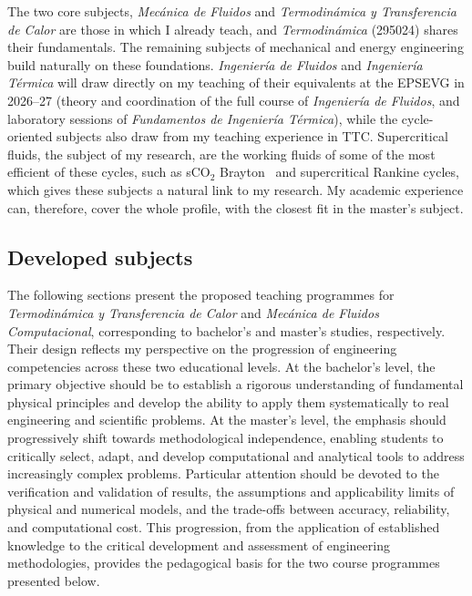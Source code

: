 \documentclass[11pt]{article}
\begin{document}
The two core subjects, \textit{Mecánica de Fluidos} and \textit{Termodinámica y Transferencia de Calor} are those in which I already teach, and \textit{Termodin\'amica} (295024) shares their fundamentals. 
The remaining subjects of mechanical and energy engineering build naturally on these foundations. \textit{Ingeniería de Fluidos} and \textit{Ingeniería
Térmica} will draw directly on my teaching of their equivalents at the EPSEVG in 2026--27 (theory and coordination of the full course of \textit{Ingeniería de Fluidos}, and laboratory sessions of \textit{Fundamentos de Ingenier\'ia T\'ermica}), while the cycle-oriented subjects also draw from my teaching experience in TTC. 
Supercritical fluids, the subject of my research, are the working fluids of some of the most efficient of these cycles, such as sCO$_2$ Brayton~\cite{Ahn2015} and supercritical Rankine cycles, which gives these subjects a natural link to my research. 
My academic experience can, therefore, cover the whole profile, with the closest fit in the master's subject.

\subsection{Developed subjects}\label{sec:dev-approach}

The following sections present the proposed teaching programmes for \textit{Termodinámica y Transferencia de Calor} and \textit{Mecánica de Fluidos Computacional}, corresponding to bachelor's and master's studies, respectively. 
Their design reflects my perspective on the progression of engineering competencies across these two educational levels.
At the bachelor's level, the primary objective should be to establish a rigorous understanding of fundamental physical principles and develop the ability to apply them systematically to real engineering and scientific problems. 
At the master's level, the emphasis should progressively shift towards methodological independence, enabling students to critically select, adapt, and develop computational and analytical tools to address increasingly complex problems. 
Particular attention should be devoted to the verification and validation of results, the assumptions and applicability limits of physical and numerical models, and the trade-offs between accuracy, reliability, and computational cost. 
This progression, from the application of established knowledge to the critical development and assessment of engineering methodologies, provides the pedagogical basis for the two course programmes presented below.
\end{document}
